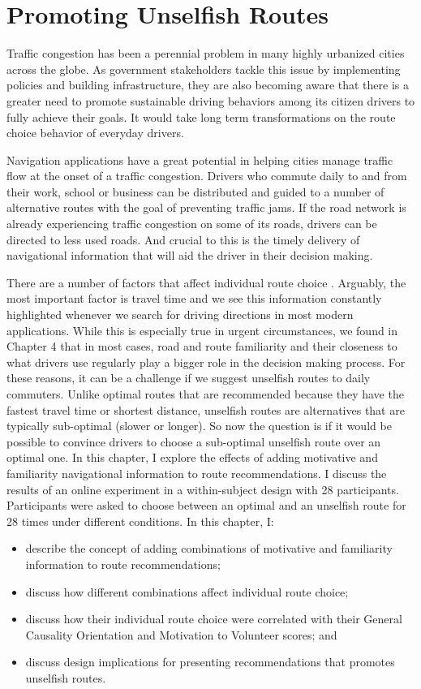 \chapter{Promoting Unselfish Routes}
Traffic congestion has been a perennial problem in many highly urbanized cities across the globe. As government stakeholders tackle this issue by implementing policies and building infrastructure, they are also becoming aware that there is a greater need to promote sustainable driving behaviors among its citizen drivers to fully achieve their goals\cite{Attard2016TheSystems,darnton2008gsr}. It would take long term transformations on the route choice behavior of everyday drivers.

Navigation applications have a great potential in helping cities manage traffic flow at the onset of a traffic congestion. Drivers who commute daily to and from their work, school or business can be distributed and guided to a number of alternative routes with the goal of preventing traffic jams. If the road network is already experiencing traffic congestion on some of its roads, drivers can be directed to less used roads. And crucial to this is the timely delivery of navigational information that will aid the driver in their decision making. 

There are a number of factors that affect individual route choice \cite{Ben-Elia2015ResponseReview,Chorus2006TravelReview}. Arguably, the most important factor is travel time and we see this information constantly highlighted whenever we search for driving directions in most modern applications. While this is especially true in urgent circumstances, we found in Chapter 4 that in most cases, road and route familiarity and their closeness to what drivers use regularly play a bigger role in the decision making process. For these reasons, it can be a challenge if we suggest unselfish routes to daily commuters. Unlike optimal routes that are recommended because they have the fastest travel time or shortest distance, unselfish routes are alternatives that are typically sub-optimal (slower or longer). So now the question is if it would be possible to convince drivers to choose a sub-optimal unselfish route over an optimal one. In this chapter, I explore the effects of adding motivative and familiarity navigational information to route recommendations. I discuss the results of an online experiment in a within-subject design with 28 participants. Participants were asked to choose between an optimal and an unselfish route for 28 times under different conditions. In this chapter, I:
\begin{itemize}
    \item describe the concept of adding combinations of motivative and familiarity information to route recommendations;
    \item discuss how different combinations affect individual route choice;
    \item discuss how their individual route choice were correlated with their General Causality Orientation and Motivation to Volunteer scores; and
    \item discuss design implications for presenting recommendations that promotes unselfish routes.
\end{itemize}


